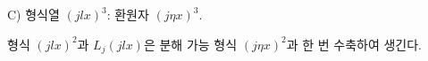 
C) 형식열 $(jlx)^3$: 환원자 $(j\eta x)^3$.

형식 $(jlx)^2$과 $L_j(jlx)$은 분해 가능 형식 $(j\eta x)^2$과 한 번 수축하여 생긴다.
